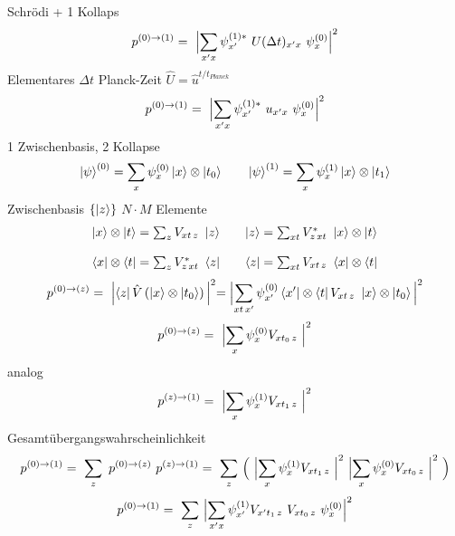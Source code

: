 \documentclass[12pt]{article}
\begin{document}
Schrödi + 1 Kollaps
\begin{equation} 
p^{(0)\rightarrow(1)} =\ \Bigl| \sum_{x'x} \psi^{(1)*}_{x'}\ U(\Delta t)_{x'x}\ \psi^{(0)}_x \Bigl|^2
\end{equation}
Elementares $\Delta t$ Planck-Zeit $\hat{U} = \hat{u}^{t/t_{Planck}}$
\begin{equation} 
p^{(0)\rightarrow(1)} =\ \Bigl| \sum_{x'x} \psi^{(1)*}_{x'}\ u_{x'x}\ \psi^{(0)}_x \Bigl|^2
\end{equation}
1 Zwischenbasis, 2 Kollapse
\begin{equation} 
\ket{\psi}^{(0)} =  \sum_{x} \psi^{(0)}_x \ket{x} \otimes \ket{t_0} \quad\quad
\ket{\psi}^{(1)} =  \sum_{x} \psi^{(1)}_x \ket{x} \otimes \ket{t_1}
\end{equation}
Zwischenbasis $\{\ket{z}\}$ $N \cdot M$ Elemente
\begin{equation} 
\begin{matrix}
\ket{x} \otimes \ket{t} = \sum_z V_{xt\, z}\ \ket{z} && 
\ket{z} = \sum_{xt} V^*_{z\, xt}\ \ket{x} \otimes \ket{t} 
\\ \\
\bra{x} \otimes \bra{t} = \sum_z V^*_{z\, xt}\ \bra{z} &&
\bra{z} = \sum_{xt} V_{xt\, z}\ \bra{x} \otimes \bra{t} 
\end{matrix}
\end{equation}
\begin{equation} 
p^{(0)\rightarrow(z)} =\ \Bigl| \bra{z} \hat{V} \left(\ket{x}\otimes\ket{t_0}\right)\Bigl|^2
= \Bigl|\sum_{xt\, x'} \psi^{(0)}_{x'} \bra{x'} \otimes \bra{t} V_{xt\, z}\ \ket{x} \otimes \ket{t_0}\Bigl|^2 
\end{equation}
\begin{equation} 
p^{(0)\rightarrow(z)} =\ \Bigl|\sum_{x} \psi^{(0)}_{x} V_{xt_0\, z}\ \Bigl|^2 
\end{equation}
analog
\begin{equation} 
p^{(z)\rightarrow(1)} =\ \Bigl|\sum_{x} \psi^{(1)}_{x} V_{xt_1\, z}\ \Bigl|^2 
\end{equation}
Gesamtübergangswahrscheinlichkeit
\begin{equation} 
p^{(0)\rightarrow(1)} =\ \sum_z\ p^{(0)\rightarrow(z)}\ p^{(z)\rightarrow(1)}
= \ \sum_{z}\ \Bigl(\ \Bigl|\sum_{x} \psi^{(1)}_{x} V_{xt_1\, z}\ \Bigl|^2\ \Bigl|\sum_{x} \psi^{(0)}_{x} V_{xt_0\, z}\ \Bigl|^2\ \Bigr)
\end{equation}
\begin{equation} 
p^{(0)\rightarrow(1)} 
= \ \sum_{z}\ \Bigl|\sum_{x'x} \psi^{(1)}_{x'} V_{x't_1\, z}\ V_{xt_0\, z}\ \psi^{(0)}_{x} \Bigl|^2  
\end{equation}
\end{document}
